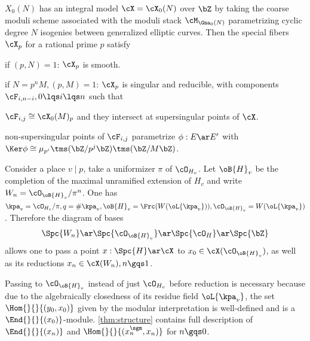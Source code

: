 \documentclass[a4paper, twoside]{article}
\begin{document}
\begin{stp}
	$X_{0}(N)$ has an integral model $\cX=\cX_{0}(N)$ over $\bZ$ by taking the coarse moduli scheme associated with the moduli stack $\cM_{\Gma_{0}(N)}$ parametrizing cyclic degree $N$ isogenies between generalized elliptic curves. Then the special fibers $\cX_{p}$ for a rational prime $p$ satisfy
	\begin{itm}
		\item if $(p,N)=1$: $\cX_{p}$ is smooth.
		\item if $N=p^{n}M, (p,M)=1$: $\cX_{p}$ is singular and reducible, with components $\cF_{i,n-i},0\lqs i\lqs n$ such that
		\begin{enr}
			\item $\cF_{i,j}\cong\cX_{0}(M)_{p}$ and they intersect at supersingular points of $\cX$.
			\item non-supersingular points of $\cF_{i,j}$ parametrize $\phi:E\ar E'$ with $\Ker\phi\cong\mu_{p^{i}}\tms(\bZ/p^{j}\bZ)\tms(\bZ/M\bZ)$.
		\end{enr}
	\end{itm}

	Consider a place $v\mid p$, take a uniformizer $\pi$ of $\cO_{H_{v}}$. Let $\oB{H}_{v}$ be the completion of the maximal unramified extension of $H_{v}$ and write $W_{n}=\cO_{\oB{H}_{v}}/\pi^{n}$. One has $\kpa_{v}=\cO_{H_{v}}/\pi, q=\#\kpa_{v}, \oB{H}_{v}=\Frc(W(\oL{\kpa_{v}})), \cO_{\oB{H}_{v}}=W(\oL{\kpa_{v}})$. Therefore the diagram of bases
	\[
		\Spc{W_{n}}\ar\Spc{\cO_{\oB{H}_{v}}}\ar\Spc{\cO_{H}}\ar\Spc{\bZ}
	\]
	allows one to pass a point $x:\Spc{H}\ar\cX$ to $x_{0}\in \cX(\cO_{\oB{H}_{v}})$, as well as its reductions $x_{n}\in\cX(W_{n}),n\gqs1$.
\end{stp}

\begin{rmk}
	Passing to $\cO_{\oB{H}_{v}}$ instead of just $\cO_{H_{v}}$ before reduction is necessary because due to the algebraically closedness of its residue field $\oL{\kpa_{v}}$, the set $\Hom{}{}{(y_{0},x_{0})}$ given by the modular interpretation is well-defined and is a $\End{}{}{(x_{0})}$-module. \cref{thm:structure} contains full description of $\End{}{}{(x_{n})}$ and $\Hom{}{}{(x_{n}^{\sgm},x_{n})}$ for $n\gqs0$.
\end{rmk}
\end{document}
